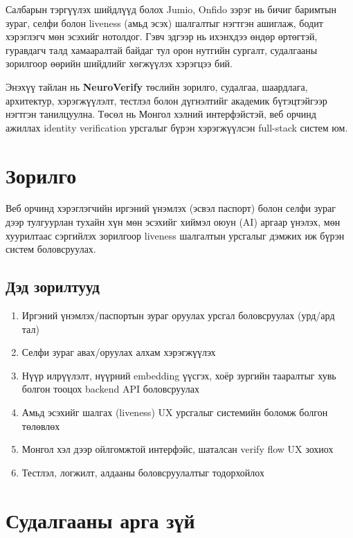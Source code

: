 \documentclass[12pt,a4paper]{article}
\begin{document}
Салбарын тэргүүлэх шийдлүүд болох Jumio, Onfido зэрэг нь бичиг баримтын зураг, селфи болон liveness (амьд эсэх) шалгалтыг нэгтгэн ашиглаж, бодит хэрэглэгч мөн эсэхийг нотолдог. Гэвч эдгээр нь ихэнхдээ өндөр өртөгтэй, гуравдагч талд хамааралтай байдаг тул орон нутгийн сургалт, судалгааны зорилгоор өөрийн шийдлийг хөгжүүлэх хэрэгцээ бий.

Энэхүү тайлан нь \textbf{NeuroVerify} төслийн зорилго, судалгаа, шаардлага, архитектур, хэрэгжүүлэлт, тестлэл болон дүгнэлтийг академик бүтэцтэйгээр нэгтгэн танилцуулна. Төсөл нь Монгол хэлний интерфэйстэй, веб орчинд ажиллах identity verification урсгалыг бүрэн хэрэгжүүлсэн full-stack систем юм.

\section{Зорилго}

Веб орчинд хэрэглэгчийн иргэний үнэмлэх (эсвэл паспорт) болон селфи зураг дээр тулгуурлан тухайн хүн мөн эсэхийг хиймэл оюун (AI) аргаар үнэлэх, мөн хуурилтаас сэргийлэх зорилгоор liveness шалгалтын урсгалыг дэмжих иж бүрэн систем боловсруулах.

\subsection{Дэд зорилтууд}
\begin{enumerate}[leftmargin=1.2cm]
  \item Иргэний үнэмлэх/паспортын зураг оруулах урсгал боловсруулах (урд/ард тал)
  \item Селфи зураг авах/оруулах алхам хэрэгжүүлэх
  \item Нүүр илрүүлэлт, нүүрний embedding үүсгэх, хоёр зургийн тааралтыг хувь болгон тооцох backend API боловсруулах
  \item Амьд эсэхийг шалгах (liveness) UX урсгалыг системийн боломж болгон төлөвлөх
  \item Монгол хэл дээр ойлгомжтой интерфэйс, шаталсан verify flow UX зохиох
  \item Тестлэл, логжилт, алдааны боловсруулалтыг тодорхойлох
\end{enumerate}

\section{Судалгааны арга зүй}
\end{document}
